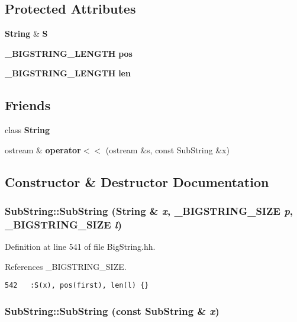 \subsection*{Protected Attributes}
\begin{CompactItemize}
\item 
{\bf String} \& {\bf S}
\item 
{\bf \_\-BIGSTRING\_\-LENGTH} {\bf pos}
\item 
{\bf \_\-BIGSTRING\_\-LENGTH} {\bf len}
\end{CompactItemize}
\subsection*{Friends}
\begin{CompactItemize}
\item 
class {\bf String}
\item 
ostream \& {\bf operator$<$$<$} (ostream \&s, const Sub\-String \&x)
\end{CompactItemize}


\subsection{Constructor \& Destructor Documentation}
\subsubsection{\setlength{\rightskip}{0pt plus 5cm}Sub\-String::Sub\-String ({\bf String} \& {\em x}, {\bf \_\-BIGSTRING\_\-SIZE} {\em p}, {\bf \_\-BIGSTRING\_\-SIZE} {\em l})\hspace{0.3cm}{\tt  [inline, protected]}}\label{classSubString_b1}




Definition at line 541 of file Big\-String.hh.

References \_\-BIGSTRING\_\-SIZE.



\footnotesize\begin{verbatim}542   :S(x), pos(first), len(l) {}
\end{verbatim}\normalsize 
{}
\subsubsection{\setlength{\rightskip}{0pt plus 5cm}Sub\-String::Sub\-String (const Sub\-String \& {\em x})\hspace{0.3cm}{\tt  [inline, protected]}}\label{classSubString_b2}




